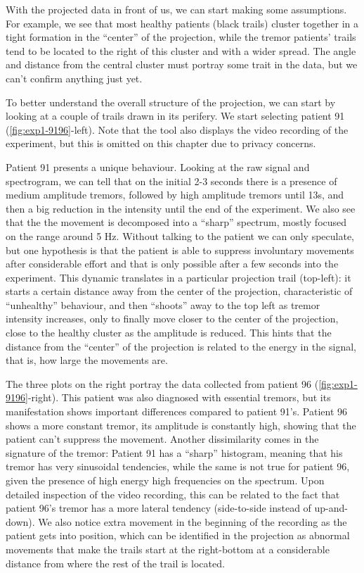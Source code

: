 With the projected data in front of us, we can start making some assumptions. For example, we see that most healthy patients (black trails) cluster together in a tight formation in the ``center'' of the projection, while the tremor patients' trails tend to be located to the right of this cluster and with a wider spread. The angle and distance from the central cluster must portray some trait in the data, but we can't confirm anything just yet.    

To better understand the overall structure of the projection, we can start by looking at a couple of trails drawn in its perifery. We start selecting patient 91 (\cref{fig:exp1-9196}-left). Note that the tool also displays the video recording of the experiment, but this is omitted on this chapter due to privacy concerns. 

Patient 91 presents a unique behaviour. Looking at the raw signal and spectrogram, we can tell that on the initial 2-3 seconds there is a presence of medium amplitude tremors, followed by high amplitude tremors until 13s, and then a big reduction in the intensity until the end of the experiment. We also see that the the movement is decomposed into a ``sharp'' spectrum, mostly focused on the range around 5 Hz. Without talking to the patient we can only speculate, but one hypothesis is that the patient is able to suppress involuntary movements after considerable effort and that is only possible after a few seconds into the experiment. This dynamic translates in a particular  projection trail (top-left): it starts a certain distance away from the center of the projection, characteristic of ``unhealthy'' behaviour, and then ``shoots'' away to the top left as tremor intensity increases, only to finally move closer to the center of the projection, close to the healthy cluster as the amplitude is reduced. This hints that the distance from the ``center'' of the projection is related to the energy in the signal, that is, how large the movements are. 

The three plots on the right portray the data collected from patient 96 (\cref{fig:exp1-9196}-right). This patient was also diagnosed with essential tremors, but its manifestation shows important differences compared to patient 91's. Patient 96 shows a more constant tremor, its amplitude is constantly high, showing that the patient can't suppress the movement. Another dissimilarity comes in the signature of the tremor: Patient 91 has a ``sharp'' histogram, meaning that his tremor has very sinusoidal tendencies, while the same is not true for patient 96, given the presence of high energy high frequencies on the spectrum. Upon detailed inspection of the video recording, this can be related to the fact that patient 96's tremor has a more lateral tendency (side-to-side instead of up-and-down).  We also notice extra movement in the beginning of the recording as the patient gets into position, which can be identified in the projection as abnormal movements that make the trails start at the right-bottom at a considerable distance from where the rest of the trail is located.   

